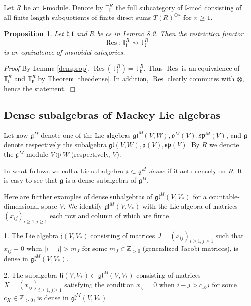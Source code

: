 \documentclass{svmult}
\newtheorem{prop}[theo]{Proposition}
\renewenvironment{proof}{ \emph{Proof}}{$\Box$}
\newcommand {\ZZ} {\mathbb {Z}}
\newcommand{\TT}{\mathbb{T}}
\newcommand{\jj}{\mathfrak{j}}
\renewcommand{\sp}{\mathfrak{sp}}
\newcommand{\kk}{\mathfrak{k}}
\newcommand{\oo}{\mathfrak{o}}
\renewcommand{\aa}{\mathfrak{a}}
\renewcommand{\gg}{\mathfrak{g}}
\renewcommand{\ll}{\mathfrak{l}}
\newcommand{\gl}{\mathfrak{gl}}
\begin{document}
Let $R$ be an $\ll$-module.
Denote by $\TT^R_{\ll}$ the full subcategory of $\ll$-mod consisting of all finite length subquotients of finite direct sums $T(R)^{\oplus n}$ for $n \geq 1$.

\begin{prop}\label{prop_eqcat} Let $\kk,\ll$ and $R$ be as in Lemma 8.2. Then the restriction functor
\begin{equation}\label{rest_fact}
 \operatorname{Res}:\TT^R_{\ll} \rightsquigarrow \TT^R_{\kk}\nonumber
\end{equation}
is an equivalence of monoidal categories.
\end{prop}

\begin{proof} By Lemma \ref{densprop},  $\operatorname{Res}(\TT^R_{\ll})=\TT^R_{\kk}$. Thus $\operatorname{Res}$ is an equivalence of $\TT_{\ll}^R$ and $\TT_{\kk}^R$ by Theorem \ref{theodense}. In addition, $\operatorname{Res}$ clearly commutes with $\otimes$, hence the statement.
\end{proof}

\subsection{Dense subalgebras of Mackey Lie algebras}\label{sect:7.2}

Let now $\gg^M$ denote one of the Lie algebras $\gl^M(V,W), \oo^M(V), \sp^M(V)$, and $\gg$ denote respectively the subalgebra $\gl(V,W), \oo(V), \sp(V)$.
By $R$ we denote the $\gg^M$-module $V\oplus W$ (respectively, $V$).

In what follows we call a Lie subalgebra 
$\aa\subset \gg^M$ \textit{dense} if it acts densely on $R$.
It is easy to see that $\gg$ is a dense subalgebra of $\gg^M$.

Here are further examples of dense subalgebras of $\gl^M(V,V_*)$ for a countable-dimensional space $V$. We identify $\gl^M(V,V_*)$ with the Lie algebra of matrices $(x_{ij})_{i\geq1,j\geq1}$ each row and column of which are finite. 

1. The Lie algebra $\jj(V,V_*)$ consisting of matrices $J = (x_{ij})_{i\geq1,j\geq1}$ such that $x_{ij}=0$ when 
$|i-j|>m_J$ for some $m_J \in \ZZ_{>0}$ (generalized Jacobi matrices), is dense in $\gl^M(V,V_*)$.

2. The subalgebra $\mathfrak{lj}(V,V_*) \subset \gl^M(V,V_*)$ consisting of matrices $X=(x_{ij})_{i\geq1,j\geq1}$ satisfying the condition $x_{ij}=0$ when $i-j>c_Xj$ for some $c_X \in \ZZ_{>0}$, is dense in $\gl^M(V,V_*)$.
\end{document}
